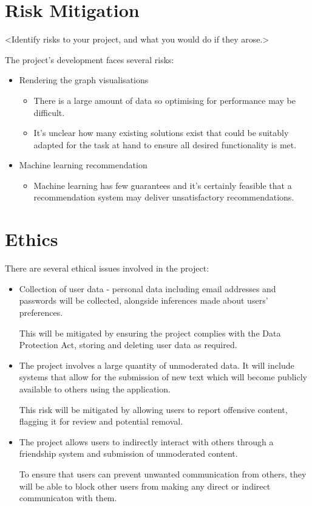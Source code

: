 %
%
\section{Risk Mitigation}

<Identify risks to your project, and what you would do if they arose.>

The project's development faces several risks:
\begin{itemize}
    \item Rendering the graph visualisations
        \begin{itemize}
            \item There is a large amount of data so optimising for performance may be difficult.
            \item It's unclear how many existing solutions exist that could be suitably adapted for the task at hand to ensure all desired functionality is met.
        \end{itemize}
    \item Machine learning recommendation
        \begin{itemize}
            \item Machine learning has few guarantees and it's certainly feasible that a recommendation system may deliver unsatisfactory recommendations.
        \end{itemize}
\end{itemize}

%
%
\section{Ethics}

There are several ethical issues involved in the project:
\begin{itemize}
\item Collection of user data - personal data including email addresses and passwords will be collected, alongside inferences made about users' preferences.

This will be mitigated by ensuring the project complies with the Data Protection Act, storing and deleting user data as required. 
\item The project involves a large quantity of unmoderated data. It will include systems that allow for the submission of new text which will become publicly available to others using the application. 

This risk will be mitigated by allowing users to report offensive content, flagging it for review and potential removal.
\item The project allows users to indirectly interact with others through a friendship system and submission of unmoderated content.

To ensure that users can prevent unwanted communication from others, they will be able to block other users from making any direct or indirect communicaton with them.
\end{itemize}